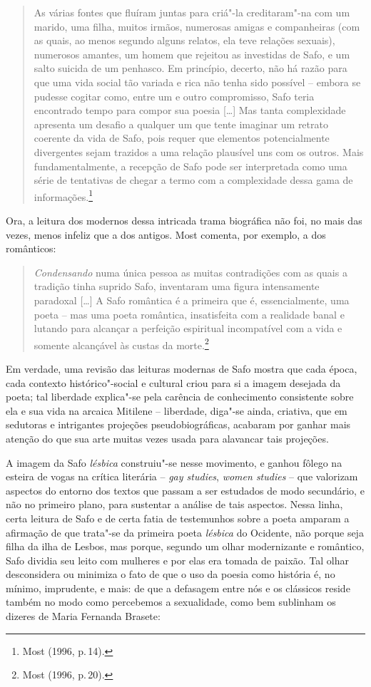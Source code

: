 \begin{quote}
As várias fontes que fluíram juntas para criá"-la creditaram"-na com um marido,
uma filha, muitos irmãos, numerosas amigas e companheiras (com as quais, ao
menos segundo alguns relatos, ela teve relações sexuais), numerosos amantes, um
homem que rejeitou as investidas de Safo, e um salto suicida de um penhasco. Em
princípio, decerto, não há razão para que uma vida social tão variada e rica
não tenha sido possível -- embora se pudesse cogitar como, entre um e outro
compromisso, Safo teria encontrado tempo para compor sua poesia {[}\ldots{}{]} Mas tanta
complexidade apresenta um desafio a qualquer um que tente imaginar um retrato
coerente da vida de Safo, pois requer que elementos potencialmente divergentes
sejam trazidos a uma relação plausível uns com os outros. Mais
fundamentalmente, a recepção de Safo pode ser interpretada como uma série de
tentativas de chegar a termo com a complexidade dessa gama de informações.\footnote{ Most (1996, p.\,14).}
\end{quote}

Ora, a leitura dos modernos dessa intricada trama biográfica não foi, no mais
das vezes, menos infeliz que a dos antigos. Most comenta, por exemplo,
a dos românticos:

\begin{quote}
\textit{Condensando} numa única pessoa as muitas contradições com as quais a
tradição tinha suprido Safo, inventaram uma figura intensamente paradoxal
{[}\ldots{}{]} A Safo romântica é a primeira que é, essencialmente, uma poeta -- mas uma
poeta romântica, insatisfeita com a realidade banal e lutando para alcançar a
perfeição espiritual incompatível com a vida e somente alcançável às custas da
morte.\footnote{ Most (1996, p.\,20).}
\end{quote}

Em verdade, uma revisão das leituras modernas de Safo mostra que cada época,
cada contexto histórico"-social e cultural criou para si a imagem desejada da
poeta; tal liberdade explica"-se pela carência de conhecimento consistente sobre
ela e sua vida na arcaica Mitilene -- liberdade, diga"-se ainda, criativa, que
em sedutoras e intrigantes projeções pseudobiográficas, acabaram por
ganhar mais atenção do que sua arte
muitas vezes usada para alavancar tais projeções. 

A imagem da Safo \textit{lésbica} construiu"-se nesse movimento, e ganhou fôlego
na esteira de vogas na crítica literária -- \textit{gay studies}, \textit{women
studies} -- que valorizam aspectos do entorno dos textos que passam a ser
estudados de modo secundário, e não no primeiro plano, para sustentar a análise
de tais aspectos. Nessa linha, certa leitura de Safo e de certa fatia de
testemunhos sobre a poeta amparam a afirmação de que trata"-se da primeira poeta
\textit{lésbica} do Ocidente, não porque seja filha da ilha de Lesbos, mas
porque, segundo um olhar modernizante e romântico, Safo dividia seu leito com mulheres e por
elas era tomada de paixão.
Tal olhar desconsidera ou minimiza o fato de que o uso da poesia como história é, no mínimo, imprudente, e mais: de que a defasagem entre nós e os clássicos reside também no modo como percebemos a sexualidade, como bem sublinham os dizeres de Maria Fernanda Brasete:


